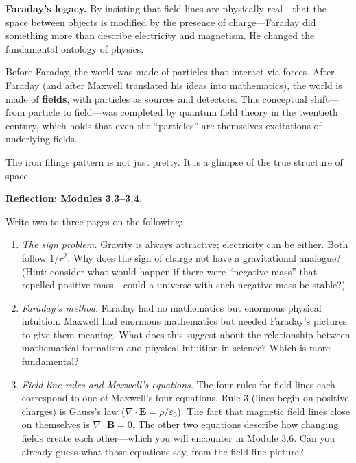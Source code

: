 \documentclass[12pt, a4paper, twoside]{book}
\newcounter{problem}[chapter]
\theoremstyle{disc}
\begin{document}
\begin{discoverybox}
\textbf{Faraday's legacy.} By insisting that field lines are physically real---that the space between objects is modified by the presence of charge---Faraday did something more than describe electricity and magnetism. He changed the fundamental ontology of physics.

Before Faraday, the world was made of particles that interact via forces. After Faraday (and after Maxwell translated his ideas into mathematics), the world is made of \textbf{fields}, with particles as sources and detectors. This conceptual shift---from particle to field---was completed by quantum field theory in the twentieth century, which holds that even the ``particles'' are themselves excitations of underlying fields.

The iron filings pattern is not just pretty. It is a glimpse of the true structure of space.
\end{discoverybox}

\begin{reflectionbox}
\textbf{Reflection: Modules 3.3--3.4.}

Write two to three pages on the following:

\begin{enumerate}[leftmargin=2em,itemsep=6pt]
  \item \textit{The sign problem.} Gravity is always attractive; electricity can be either. Both follow $1/r^2$. Why does the sign of charge not have a gravitational analogue? (Hint: consider what would happen if there were ``negative mass'' that repelled positive mass---could a universe with such negative mass be stable?)

  \item \textit{Faraday's method.} Faraday had no mathematics but enormous physical intuition. Maxwell had enormous mathematics but needed Faraday's pictures to give them meaning. What does this suggest about the relationship between mathematical formalism and physical intuition in science? Which is more fundamental?

  \item \textit{Field line rules and Maxwell's equations.} The four rules for field lines each correspond to one of Maxwell's four equations. Rule 3 (lines begin on positive charges) is Gauss's law ($\nabla \cdot \bm{E} = \rho/\varepsilon_0$). The fact that magnetic field lines close on themselves is $\nabla \cdot \bm{B} = 0$. The other two equations describe how changing fields create each other---which you will encounter in Module 3.6. Can you already guess what those equations say, from the field-line picture?
\end{enumerate}
\end{reflectionbox}
\end{document}
